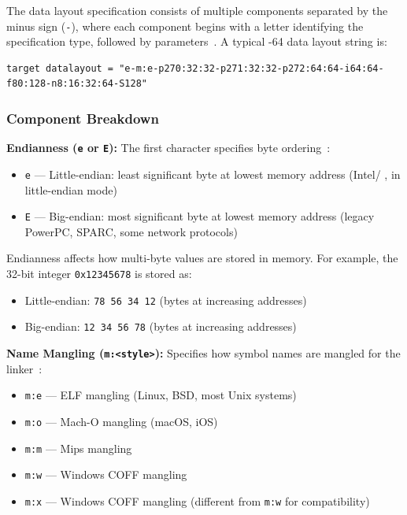 The data layout specification consists of multiple components separated by the minus sign (\texttt{-}), where each component begins with a letter identifying the specification type, followed by parameters~\cite{llvmlangref}. A typical -64 data layout string is:

\begin{lstlisting}[style=ir]
target datalayout = "e-m:e-p270:32:32-p271:32:32-p272:64:64-i64:64-f80:128-n8:16:32:64-S128"
\end{lstlisting}

\subsubsection*{Component Breakdown}

\textbf{Endianness (\texttt{e} or \texttt{E}):} The first character specifies byte ordering~\cite{llvmlangref}:
\begin{itemize}[noitemsep]
  \item \texttt{e} --- Little-endian: least significant byte at lowest memory address (Intel/ ,  in little-endian mode)
  \item \texttt{E} --- Big-endian: most significant byte at lowest memory address (legacy PowerPC, SPARC, some network protocols)
\end{itemize}

Endianness affects how multi-byte values are stored in memory. For example, the 32-bit integer \texttt{0x12345678} is stored as:
\begin{itemize}[noitemsep]
  \item Little-endian: \texttt{78 56 34 12} (bytes at increasing addresses)
  \item Big-endian: \texttt{12 34 56 78} (bytes at increasing addresses)
\end{itemize}

\textbf{Name Mangling (\texttt{m:<style>}):} Specifies how symbol names are mangled for the linker~\cite{llvmlangref}:
\begin{itemize}[noitemsep]
  \item \texttt{m:e} --- ELF mangling (Linux, BSD, most Unix systems)
  \item \texttt{m:o} --- Mach-O mangling (macOS, iOS)
  \item \texttt{m:m} --- Mips mangling
  \item \texttt{m:w} --- Windows COFF mangling
  \item \texttt{m:x} --- Windows COFF  mangling (different from \texttt{m:w} for compatibility)
\end{itemize}

